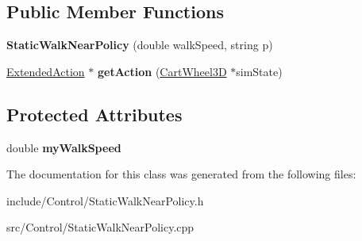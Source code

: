 \subsection*{Public Member Functions}
\begin{DoxyCompactItemize}
\item 
\hypertarget{classCartWheel_1_1StaticWalkNearPolicy_a8d067fea552f180544c00cbd922ccad6}{
{\bfseries StaticWalkNearPolicy} (double walkSpeed, string p)}
\label{classCartWheel_1_1StaticWalkNearPolicy_a8d067fea552f180544c00cbd922ccad6}

\item 
\hypertarget{classCartWheel_1_1StaticWalkNearPolicy_abef5bee06467fefc5cad035da0b8edba}{
\hyperlink{classCartWheel_1_1ExtendedAction}{ExtendedAction} $\ast$ {\bfseries getAction} (\hyperlink{classCartWheel_1_1CartWheel3D}{CartWheel3D} $\ast$simState)}
\label{classCartWheel_1_1StaticWalkNearPolicy_abef5bee06467fefc5cad035da0b8edba}

\end{DoxyCompactItemize}
\subsection*{Protected Attributes}
\begin{DoxyCompactItemize}
\item 
\hypertarget{classCartWheel_1_1StaticWalkNearPolicy_a10fd3d32972936a25a6e111b923d0d93}{
double {\bfseries myWalkSpeed}}
\label{classCartWheel_1_1StaticWalkNearPolicy_a10fd3d32972936a25a6e111b923d0d93}

\end{DoxyCompactItemize}


The documentation for this class was generated from the following files:\begin{DoxyCompactItemize}
\item 
include/Control/StaticWalkNearPolicy.h\item 
src/Control/StaticWalkNearPolicy.cpp\end{DoxyCompactItemize}
